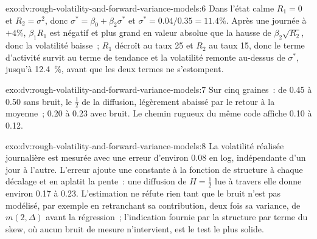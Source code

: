 \begin{solution}{exo:dv:rough-volatility-and-forward-variance-models:6}
Dans l'état calme $R_1=0$ et $R_2=\sigma^2$, donc $\sigma^*=\beta_0+\beta_2\sigma^*$ et $\sigma^*=0.04/0.35=11.4\%$.
Après une journée à $+4\%$, $\beta_1R_1$ est négatif et plus grand en valeur absolue que la hausse de $\beta_2\sqrt{R_2}$, donc
la volatilité baisse~; $R_1$ décroît au taux 25 et $R_2$ au taux 15, donc le terme d'activité survit au terme de tendance et
la volatilité remonte au-dessus de $\sigma^*$, jusqu'à 12.4~\%, avant que les deux termes ne s'estompent.
\end{solution}

\begin{solution}{exo:dv:rough-volatility-and-forward-variance-models:7}
Sur cinq graines~: de 0.45 à 0.50 sans bruit, le $\frac12$ de la diffusion, légèrement abaissé par le retour à la moyenne~; 0.20
à 0.23 avec bruit. Le chemin rugueux du même code affiche 0.10 à 0.12.
\end{solution}

\begin{solution}{exo:dv:rough-volatility-and-forward-variance-models:8}
La volatilité réalisée journalière est mesurée avec une erreur d'environ 0.08 en log, indépendante d'un jour à l'autre. L'erreur
ajoute une constante à la fonction de structure à chaque décalage et en aplatit la pente~: une diffusion de $H=\frac12$
lue à travers elle donne environ 0.17 à 0.23. L'estimation ne réfute rien tant que le bruit n'est pas modélisé, par exemple en retranchant sa contribution, deux fois
sa variance, de $m(2,\Delta)$ avant la régression~; l'indication
fournie par la structure par terme du skew, où aucun bruit de mesure n'intervient, est le test le plus solide.
\end{solution}

